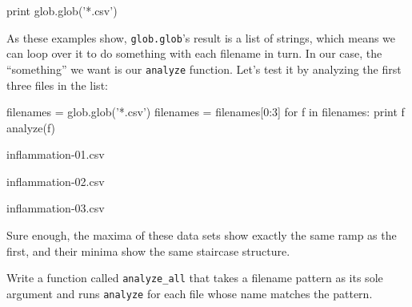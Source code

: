 \documentclass{book}
\begin{document}
\begin{VerbIn}
print glob.glob('*.csv')
\end{VerbIn}

\begin{VerbOut}
\end{VerbOut}

As these examples show, \texttt{glob.glob}'s result is a list of
strings, which means we can loop over it to do something with each
filename in turn. In our case, the ``something'' we want is our
\texttt{analyze} function. Let's test it by analyzing the first three
files in the list:

\begin{VerbIn}
filenames = glob.glob('*.csv')
filenames = filenames[0:3]
for f in filenames:
    print f
    analyze(f)
\end{VerbIn}

\begin{VerbOut}
inflammation-01.csv

inflammation-02.csv

inflammation-03.csv

\end{VerbOut}

Sure enough, the maxima of these data sets show exactly the same ramp as
the first, and their minima show the same staircase structure.

\begin{challenge}
  Write a function called \texttt{analyze\_all} that takes a filename
  pattern as its sole argument and runs \texttt{analyze} for each file
  whose name matches the pattern.
\end{challenge}
\end{document}
